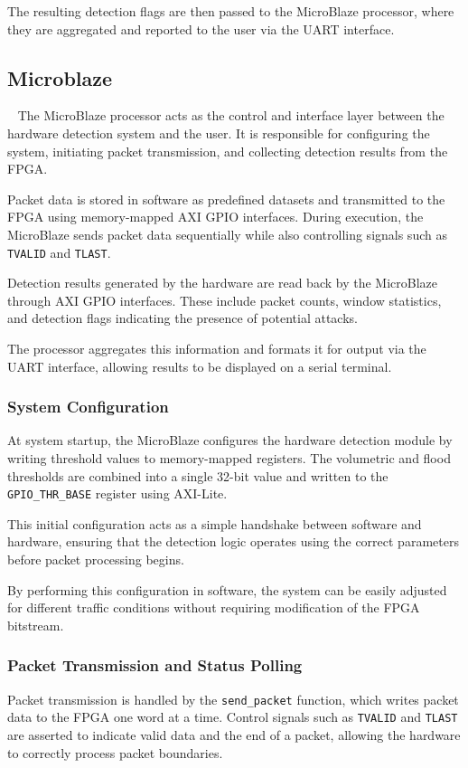 The resulting detection flags are then passed to the MicroBlaze processor,
where they are aggregated and reported to the user via the UART interface.






\subsection{Microblaze}~\label{sec:MicroBlaze}
The MicroBlaze processor acts as the control and interface layer between the
hardware detection system and the user. It is responsible for configuring the
system, initiating packet transmission, and collecting detection results from
the FPGA.

Packet data is stored in software as predefined datasets and transmitted to
the FPGA using memory-mapped AXI GPIO interfaces. During execution, the
MicroBlaze sends packet data sequentially while also controlling signals such
as \texttt{TVALID} and \texttt{TLAST}.

Detection results generated by the hardware are read back by the MicroBlaze
through AXI GPIO interfaces. These include packet counts, window statistics,
and detection flags indicating the presence of potential attacks.

The processor aggregates this information and formats it for output via the
UART interface, allowing results to be displayed on a serial terminal.


\subsubsection{System Configuration}
At system startup, the MicroBlaze configures the hardware detection module by
writing threshold values to memory-mapped registers. The volumetric and flood
thresholds are combined into a single 32-bit value and written to the
\texttt{GPIO\_THR\_BASE} register using AXI-Lite.

This initial configuration acts as a simple handshake between software and
hardware, ensuring that the detection logic operates using the correct
parameters before packet processing begins.

By performing this configuration in software, the system can be easily adjusted
for different traffic conditions without requiring modification of the FPGA
bitstream.

\subsubsection{Packet Transmission and Status Polling}
Packet transmission is handled by the \texttt{send\_packet} function, which
writes packet data to the FPGA one word at a time. Control signals such as
\texttt{TVALID} and \texttt{TLAST} are asserted to indicate valid data and the
end of a packet, allowing the hardware to correctly process packet boundaries.

